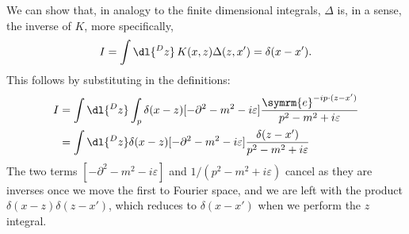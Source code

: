 \documentclass[fleqn]{NotesClass}
\newcommand{\dalembertian}{\partial^2}
\newcommand{\e}{\symrm{e}}
\begin{document}
    We can show that, in analogy to the finite dimensional integrals, \(\Delta\) is, in a sense, the inverse of \(K\), more specifically,
    \begin{equation}
        I = \int \dl{^Dz} \, K(x, z) \Delta(z, x') = \delta(x - x').
    \end{equation}
    This follows by substituting in the definitions:
    \begin{align}
        I &= \int \dl{^Dz} \int_p \delta(x - z)[-\dalembertian - m^2 - i\varepsilon] \frac{\e^{-ip\cdot (z - x')}}{p^2 - m^2 + i\varepsilon}\\
        &= \int \dl{^Dz} \delta(x - z)[-\dalembertian - m^2 - i\varepsilon] \frac{\delta(z - x')}{p^2 - m^2 + i\varepsilon}
    \end{align}
    The two terms \([-\dalembertian - m^2 - i\varepsilon]\) and \(1/(p^2 - m^2 + i\varepsilon)\) cancel as they are inverses once we move the first to Fourier space, and we are left with the product \(\delta(x - z)\delta(z - x')\), which reduces to \(\delta(x - x')\) when we perform the \(z\) integral.
    
\end{document}
